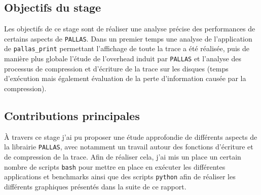 \subsection{Objectifs du stage}\label{ssec:introduction_objectifs}

Les objectifs de ce stage sont de réaliser une analyse précise des performances de certains aspects de \verb!PALLAS!. Dans un premier temps une analyse de l'application de \verb!pallas_print! permettant
l'affichage de toute la trace a été réalisée, puis de manière plus globale l'étude de l'overhead induit par \verb!PALLAS! et l'analyse des processus de compression et d'écriture de la trace sur les disques (temps d'exécution mais 
également évaluation de la perte d'information causée par la compression). 



\subsection{Contributions principales}\label{ssec:introduction_contributions}
À travers ce stage j'ai pu proposer une étude approfondie de différents aspects de la librairie \verb!PALLAS!, avec notamment un travail autour des fonctions d'écriture et de compression
de la trace.
Afin de réaliser cela, j'ai mis un place un certain nombre de scripts \verb!bash! pour mettre en place en exécuter les différentes applications et benchmarks ainsi que des 
scripts \verb!python! afin de réaliser les différents graphiques présentés dans la suite de ce rapport.
